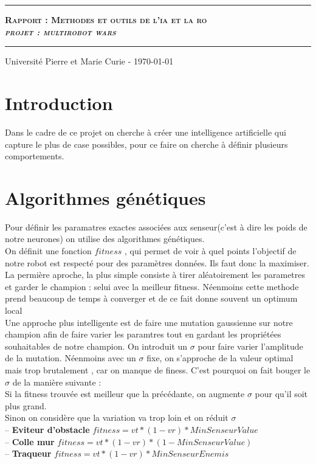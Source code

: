 \documentclass[11pt]{article}
\date{}
\author{\scshape Becirspahic Lucas}
\makeatletter
\renewcommand{\maketitle}{
\begin{titlepage}%
    \vspace*{7cm}
	\hrule
	\begin{center}
		{\bfseries \scshape {\huge Rapport : Methodes et outils de l'ia et la ro} \\[1em] {\itshape \LARGE  projet : multirobot wars}}
	\end{center}
	\vspace{1em}
	\hrule
	 \begin{center}
      \Large \@author \par
    \end{center}	
    \vfill
	\begin{center}
	Université Pierre et Marie Curie - \today
	\end{center}
    \end{titlepage}
}
\makeatother
\begin{document}
\maketitle




\section{Introduction}

Dans le cadre de ce projet on cherche à créer une intelligence artificielle qui capture le plus de case possibles, pour ce faire on cherche à définir plusieurs comportements.


\section{Algorithmes génétiques}
Pour définir les paramatres exactes associées aux senseur(c'est à dire les poids de notre neurones) on utilise des algorithmes génétiques. \\
On définit une fonction $fitness$ , qui permet de voir à quel points l'objectif de notre robot est respecté pour des paramètres données. Ils faut donc la maximiser. \\
La permière aproche, la plus simple consiste à tirer aléatoirement les parametres et garder le champion : selui avec la meilleur fitness. Néenmoins cette methode prend beaucoup de temps à converger et de ce fait donne souvent un optimum local \\
Une approche plus intelligente est de faire une mutation gaussienne sur notre champion afin de faire varier les paramtres tout en gardant les propriétées souhaitables de notre champion. On introduit un $\sigma$ pour faire varier l'amplitude de la mutation. Néenmoins avec un $\sigma$ fixe, on s'approche de la valeur optimal mais trop brutalement , car on manque de finess. C'est pourquoi on fait bouger le $\sigma$ de la manière suivante : \\
Si la fitness trouvée est meilleur que la précédante, on augmente $\sigma$ pour qu'il soit plus grand. \\
Sinon on considère que la variation va trop loin et on réduit $\sigma$ \\


-- \textbf {Eviteur d'obstacle} $fitness=vt*(1-vr)*MinSenseurValue$ \\
-- \textbf {Colle mur} $fitness=vt*(1-vr)*(1-MinSenseurValue)$ \\
-- \textbf {Traqueur} $fitness=vt*(1-vr)*MinSenseurEnemis$ \\
\end{document}
